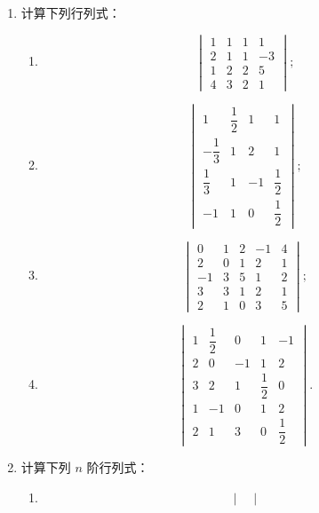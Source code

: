 \begin{enumerate}
\begin{enumerate}
\[\begin{vmatrix}
      0&0&2&1\\
      0&0&0&3
    \end{vmatrix};
    \]
  \anssub
    \item \[
    \begin{vmatrix}
      1&-1&2\\
      3&2&1\\
      0&1&4
    \end{vmatrix}.
    \]
  \anssub
  \end{enumerate}
  \item 计算下列行列式：
  \begin{enumerate}
    \item \[
    \begin{vmatrix}
      1&1&1&1\\
      2&1&1&-3\\
      1&2&2&5\\
      4&3&2&1
    \end{vmatrix};
    \]
  \anssub
    \item \[
    \begin{vmatrix}
      1&\dfrac12&1&1\\[4pt]
      -\dfrac13&1&2&1\\[4pt]
      \dfrac13&1&-1&\dfrac12\\[4pt]
      -1&1&0&\dfrac12
    \end{vmatrix};
    \]
  \anssub
    \item \[
    \begin{vmatrix}
      0&1&2&-1&4\\
      2&0&1&2&1\\
      -1&3&5&1&2\\
      3&3&1&2&1\\
      2&1&0&3&5
    \end{vmatrix};
    \]
  \anssub
    \item \[
    \begin{vmatrix}
      1&\dfrac12&0&1&-1\\[4pt]
      2&0&-1&1&2\\
      3&2&1&\dfrac12&0\\[4pt]
      1&-1&0&1&2\\
      2&1&3&0&\dfrac12
    \end{vmatrix}.
    \]
  \anssub
  \end{enumerate}
  \item 计算下列 $n$ 阶行列式：
  \begin{enumerate}
    \item \[
    \begin{vmatrix}

\end{vmatrix}\]
\end{enumerate}
\end{enumerate}
